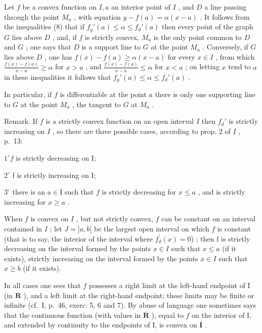 Let \(f\) be a convex function on \(I, a\) an interior point of \(I\) , and \(D\) a line passing through the point \(M_a\) , with equation \(y - f(a) = \alpha(x - a)\) . It follows from the inequalities (8) that if \(f_g'(a) \leqslant \alpha \leqslant f_d'(a)\) then every point of the graph \(G\) lies above \(D\) , and, if \(f\) is strictly convex, \(M_a\) is the only point common to \(D\) and \(G\) ; one says that \(D\) is a support line to \(G\) at the point \(M_a\) . Conversely, if \(G\) lies above \(D\) , one has \(f(x) - f(a) \geqslant \alpha(x - a)\) for every \(x \in I\) , from which \(\frac{f(x) - f(a)}{x - a} \geqslant \alpha\) for \(x > a\) , and \(\frac{f(x) - f(a)}{x - a} \leqslant \alpha\) for \(x < a\) ; on letting \(x\) tend to \(a\) in these inequalities it follows that \(f_g'(a) \leqslant \alpha \leqslant f_d'(a)\) .

In particular, if \(f\) is differentiable at the point \(a\) there is only one supporting line to \(G\) at the point \(M_a\) , the tangent to \(G\) at \(M_a\) .

Remark. If \(f\) is a strictly convex function on an open interval \(I\) then \(f_d'\) is strictly increasing on \(I\) , so there are three possible cases, according to prop. 2 of \(I\) , p.~13:

\(1^{\circ} f\) is strictly decreasing on I;

\(2^{\circ}\) f is strictly increasing on I;

\(3^{\circ}\) there is an \(a \in \mathrm{I}\) such that \(f\) is strictly decreasing for \(x \leqslant a\) , and is strictly increasing for \(x \geqslant a\) .

When \(f\) is convex on \(I\) , but not strictly convex, \(f\) can be constant on an interval contained in \(I\) ; let \(J = ]a, b[\) be the largest open interval on which \(f\) is constant (that is to say, the interior of the interval where \(f_{d}^{\prime}(x)=0\)) ; then f is strictly decreasing on the interval formed by the points \(x\in I\) such that \(x\leqslant a\) (if it exists), strictly increasing on the interval formed by the points \(x\in I\) such that \(x\geqslant b\) (if it exists).

In all cases one sees that \(f\) possesses a right limit at the left-hand endpoint of I (in \(\overline{\mathbf{R}}\) ), and a left limit at the right-hand endpoint; these limits may be finite or infinite (cf.~I, p.~46, exerc. 5, 6 and 7). By abuse of language one sometimes says that the continuous function (with values in \(\overline{\mathbf{R}}\) ), equal to \(f\) on the interior of I, and extended by continuity to the endpoints of I, is convex on \(\overline{\mathbf{I}}\) .

